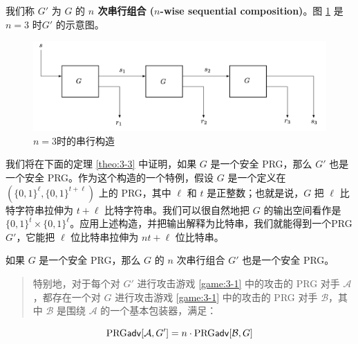 \vspace*{5pt}

\noindent
我们称 $G'$ 为 $G$ 的 \textbf{$n$ 次串行组合 ($n$-wise sequential composition)}。图 \ref{fig:3-6} 是 $n=3$ 时$G'$ 的示意图。

\begin{figure}
  \centering
  \includegraphics[width=0.8\linewidth]{figures/chapter3/fig6.png}
  \caption{$n=3$时的串行构造}
  \label{fig:3-6}
\end{figure}

我们将在下面的定理 \ref{theo:3-3} 中证明，如果 $G$ 是一个安全 PRG，那么 $G'$ 也是一个安全 PRG。作为这个构造的一个特例，假设 $G$ 是一个定义在 $(\{0,1\}^\ell,\{0,1\}^{t+\ell})$ 上的 PRG，其中 $\ell$ 和 $t$ 是正整数；也就是说，$G$ 把 $\ell$ 比特字符串拉伸为 $t+\ell$ 比特字符串。我们可以很自然地把 $G$ 的输出空间看作是 $\{0,1\}^t\times\{0,1\}^\ell$。应用上述构造，并把输出解释为比特串，我们就能得到一个PRG $G'$，它能把 $\ell$ 位比特串拉伸为 $nt+\ell$ 位比特串。

\begin{theorem}\label{theo:3-3}
如果 $G$ 是一个安全 PRG，那么 $G$ 的 $n$ 次串行组合 $G'$ 也是一个安全 PRG。
\begin{quote}
特别地，对于每个对 $G'$ 进行攻击游戏 \ref{game:3-1} 中的攻击的 PRG 对手 $\mathcal A$，都存在一个对 $G$ 进行攻击游戏 \ref{game:3-1} 中的攻击的 PRG 对手 $\mathcal B$，其中 $\mathcal B$ 是围绕 $\mathcal A$ 的一个基本包装器，满足：
\end{quote}
$$
{\rm PRG\mathsf{adv}}[\mathcal{A},G']=n\cdot{\rm PRG\mathsf{adv}}[\mathcal{B},G]
$$
\end{theorem}

